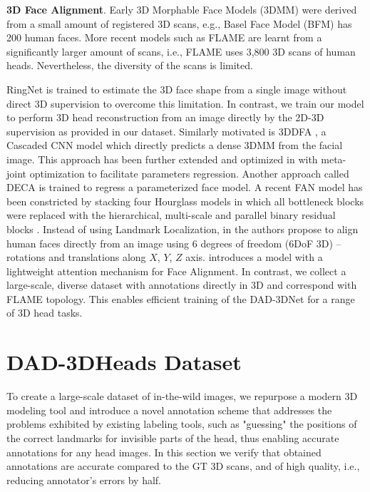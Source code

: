 \documentclass[10pt,twocolumn,letterpaper]{article}
\begin{document}
\textbf{3D Face Alignment}. Early 3D Morphable Face Models (3DMM) \cite{3dmm, bazelface} were derived from a small amount of registered 3D scans, e.g.,  Basel Face Model (BFM) \cite{bazelface} has 200 human faces. 
More recent models such as FLAME \cite{FLAME} are learnt from a significantly larger amount of scans, i.e., FLAME uses 3,800 3D scans of human heads. 
Nevertheless, the diversity of the scans is limited. 

RingNet\cite{RingNet} is trained to estimate the 3D face shape from a single image without direct 3D supervision to overcome this limitation. 
In contrast, we train our model to perform 3D head reconstruction from an image directly by the 2D-3D supervision as provided in our dataset.
Similarly motivated is 3DDFA \cite{zhu2017face}, a Cascaded CNN model which directly predicts a dense 3DMM from the facial image. 
This approach has been further extended and optimized in \cite{guo2020towards} with meta-joint optimization to facilitate parameters regression. 
Another approach called DECA \cite{DECA} is trained to regress a parameterized face model. 
A recent FAN model \cite{bulat_how_far} has been constricted by stacking four Hourglass models \cite{newell, StackedHourglass} in which all bottleneck blocks were replaced with the hierarchical, multi-scale and parallel binary residual blocks \cite{bulat_binarized}.
Instead of using Landmark Localization, in \cite{FacePoseNet} the authors propose to align human faces directly from an image using 6 degrees of freedom (6DoF 3D) -- rotations and translations along $X$, $Y$, $Z$ axis. 
\cite{DAMDNet} introduces a model with a lightweight attention mechanism for Face Alignment. 
In contrast, we collect a large-scale, diverse dataset with annotations directly in 3D and correspond with FLAME topology. This enables efficient training of the DAD-3DNet for a range of 3D head tasks. 
%
 \section{DAD-3DHeads Dataset}







To create a large-scale dataset of in-the-wild images, we repurpose a modern 3D
modeling tool and introduce a novel annotation scheme that addresses the problems exhibited by existing labeling tools, such as "guessing" the positions of the correct landmarks for invisible parts of the head, thus enabling accurate annotations for any head images.
In this section we verify that obtained annotations are accurate compared to the GT 3D scans, and of high quality, i.e., reducing annotator's errors by half. 
\end{document}
